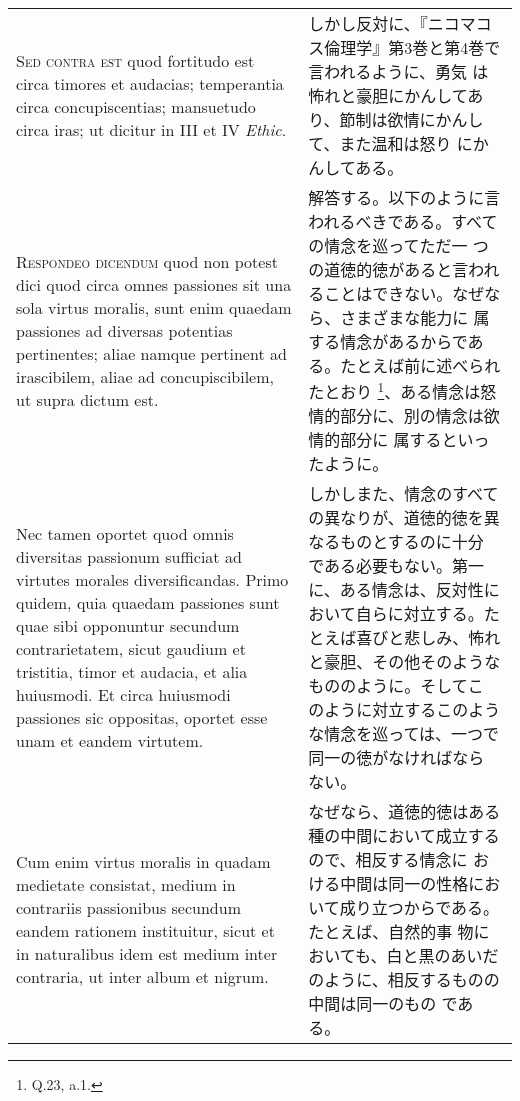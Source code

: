 \documentclass[10pt]{jsarticle}
\begin{document}
\begin{longtable}{p{21em}p{21em}}
 
\\




{\scshape Sed contra est} quod fortitudo est circa timores et
audacias; temperantia circa concupiscentias; mansuetudo circa iras; ut
dicitur in III et IV {\itshape Ethic}.
 
&

 しかし反対に、『ニコマコス倫理学』第3巻と第4巻で言われるように、勇気
 は怖れと豪胆にかんしてあり、節制は欲情にかんして、また温和は怒り
 にかんしてある。

 
\\


 {\scshape Respondeo dicendum} quod non potest dici quod circa omnes
 passiones sit una sola virtus moralis, sunt enim quaedam passiones ad
 diversas potentias pertinentes; aliae namque pertinent ad
 irascibilem, aliae ad concupiscibilem, ut supra dictum est. 
&

 解答する。以下のように言われるべきである。すべての情念を巡ってただ一
つの道徳的徳があると言われることはできない。なぜなら、さまざまな能力に
属する情念があるからである。たとえば前に述べられたとおり
\footnote{Q.23, a.1.}、ある情念は怒情的部分に、別の情念は欲情的部分に
属するといったように。
 
 
\\

Nec tamen oportet quod omnis diversitas passionum sufficiat ad
virtutes morales diversificandas.  Primo quidem, quia quaedam
passiones sunt quae sibi opponuntur secundum contrarietatem, sicut
gaudium et tristitia, timor et audacia, et alia huiusmodi. Et circa
huiusmodi passiones sic oppositas, oportet esse unam et eandem
virtutem. 

 &

しかしまた、情念のすべての異なりが、道徳的徳を異なるものとするのに十分
である必要もない。第一に、ある情念は、反対性において自らに対立する。た
とえば喜びと悲しみ、怖れと豪胆、その他そのようなもののように。そしてこ
のように対立するこのような情念を巡っては、一つで同一の徳がなければなら
ない。
 
\\

Cum enim virtus moralis in quadam medietate consistat,
medium in contrariis passionibus secundum eandem rationem instituitur,
sicut et in naturalibus idem est medium inter contraria, ut inter
album et nigrum.

 &

 なぜなら、道徳的徳はある種の中間において成立するので、相反する情念に
 おける中間は同一の性格において成り立つからである。たとえば、自然的事
 物においても、白と黒のあいだのように、相反するものの中間は同一のもの
 である。


\end{longtable}
\end{document}
